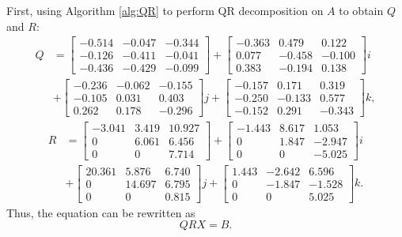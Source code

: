 \documentclass[12pt]{article}
\begin{document}
First, using Algorithm \ref{alg:QR} to perform QR decomposition on $A$ to obtain $Q$ and $R:$
\setlength{\jot}{2pt}
\setlength{\arraycolsep}{1pt}
\begin{align*}
  Q &=
     \begin{bmatrix}
    -0.514 & -0.047 & -0.344 \\
    -0.126 & -0.411 & -0.041 \\
    -0.436 & -0.429 & -0.099
    \end{bmatrix} +
    \begin{bmatrix}
    -0.363 &  0.479 &  0.122 \\
     0.077 & -0.458 & -0.100 \\
     0.383 & -0.194 &  0.138
    \end{bmatrix} i \\
    & + 
    \begin{bmatrix}
    -0.236 & -0.062 & -0.155 \\
    -0.105 &  0.031 &  0.403 \\
     0.262 &  0.178 & -0.296
    \end{bmatrix} j +
    \begin{bmatrix}
    -0.157 &  0.171 &  0.319 \\
    -0.250 & -0.133 &  0.577 \\
    -0.152 &  0.291 & -0.343
    \end{bmatrix} k,
\end{align*}
\begin{align*}
  R &=
     \begin{bmatrix}
    -3.041 & 3.419 & 10.927 \\
     0     & 6.061 & 6.456 \\
     0     & 0     & 7.714
    \end{bmatrix} +
    \begin{bmatrix}
    -1.443 & 8.617 &  1.053 \\
     0     & 1.847 & -2.947 \\
     0     & 0     & -5.025
    \end{bmatrix} i \\
    &+ 
    \begin{bmatrix}
    20.361 & 5.876  & 6.740 \\
     0     & 14.697 & 6.795 \\
     0     & 0      & 0.815
    \end{bmatrix} j +
    \begin{bmatrix}
    1.443 & -2.642 &  6.596 \\
    0     & -1.847 & -1.528 \\
    0     &  0     &  5.025
    \end{bmatrix} k.
\end{align*}
Thus, the equation can be rewritten as
\begin{equation}
    QRX = B.\label{eq:example1}
\end{equation}
\end{document}
